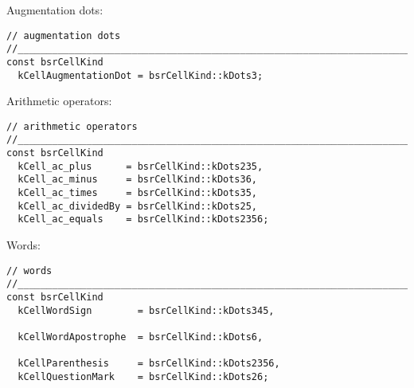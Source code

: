 Augmentation dots:
\begin{lstlisting}[language=CPlusPlus]
// augmentation dots
//______________________________________________________________________________
const bsrCellKind
  kCellAugmentationDot = bsrCellKind::kDots3;
\end{lstlisting}

Arithmetic operators:
\begin{lstlisting}[language=CPlusPlus]
// arithmetic operators
//______________________________________________________________________________
const bsrCellKind
  kCell_ac_plus      = bsrCellKind::kDots235,
  kCell_ac_minus     = bsrCellKind::kDots36,
  kCell_ac_times     = bsrCellKind::kDots35,
  kCell_ac_dividedBy = bsrCellKind::kDots25,
  kCell_ac_equals    = bsrCellKind::kDots2356;
\end{lstlisting}

Words:
\begin{lstlisting}[language=CPlusPlus]
// words
//______________________________________________________________________________
const bsrCellKind
  kCellWordSign        = bsrCellKind::kDots345,

  kCellWordApostrophe  = bsrCellKind::kDots6,

  kCellParenthesis     = bsrCellKind::kDots2356,
  kCellQuestionMark    = bsrCellKind::kDots26;
\end{lstlisting}


